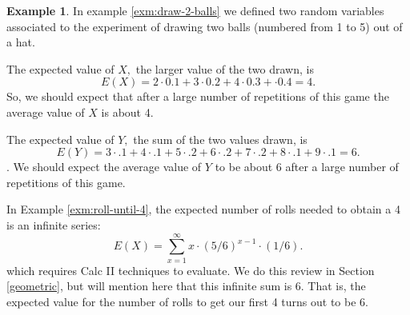 \documentclass[
]{book}
\theoremstyle{definition}
\theoremstyle{definition}
\newtheorem{example}{Example}[chapter]
\theoremstyle{definition}
\theoremstyle{definition}
\theoremstyle{remark}
\begin{document}
\begin{example}
\protect\hypertarget{exm:first-EV}{}\label{exm:first-EV}In example \ref{exm:draw-2-balls} we defined two random variables associated to the experiment of drawing two balls (numbered from 1 to 5) out of a hat.

The expected value of \(X,\) the larger value of the two drawn, is \[E(X) = 2 \cdot 0.1 + 3 \cdot 0.2 + 4 \cdot 0.3 + \cdot 0.4 = 4.\] So, we should expect that after a large number of repetitions of this game the average value of \(X\) is about 4.

The expected value of \(Y,\) the sum of the two values drawn, is \[E(Y) = 3 \cdot .1 + 4 \cdot .1 + 5 \cdot .2 + 6 \cdot .2 + 7 \cdot .2 + 8 \cdot .1 + 9 \cdot .1 = 6.\]. We should expect the average value of \(Y\) to be about 6 after a large number of repetitions of this game.

In Example \ref{exm:roll-until-4}, the expected number of rolls needed to obtain a 4 is an infinite series:
\[E(X) = \sum_{x = 1}^\infty x \cdot (5/6)^{x-1} \cdot (1/6).\]
which requires Calc II techniques to evaluate. We do this review in Section \ref{geometric}, but will mention here that this infinite sum is 6. That is, the expected value for the number of rolls to get our first 4 turns out to be 6.
\end{example}
\end{document}
